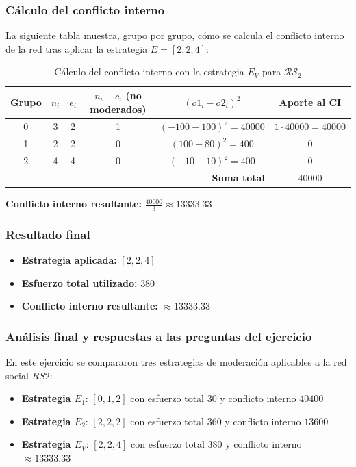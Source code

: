 \documentclass[11pt,letter]{article}
\begin{document}
\subsubsection*{Cálculo del conflicto interno}

La siguiente tabla muestra, grupo por grupo, cómo se calcula el conflicto interno de la red tras aplicar la estrategia $E = [2, 2, 4]$:

\begin{table}[H]
\centering
\begin{tabular}{c|c|c|c|c|c}
\textbf{Grupo} & $n_i$ & $e_i$ & $n_i - c_i$ (no moderados) & $(o1_i - o2_i)^2$ & Aporte al CI \\
\hline
0 & 3 & 2 & 1 & $( -100 - 100 )^2 = 40000$ & $1 \cdot 40000 = 40000$ \\
1 & 2 & 2 & 0 & $(100 - 80)^2 = 400$ & $0$ \\
2 & 4 & 4 & 0 & $(-10 - 10)^2 = 400$ & $0$ \\
\hline
\multicolumn{5}{r|}{\textbf{Suma total}} & 40000 \\
\end{tabular}
\caption{Cálculo del conflicto interno con la estrategia $E_V$ para $\mathcal{RS}_2$}
\end{table}

\textbf{Conflicto interno resultante:} $\frac{40000}{3} \approx 13333.33$

\subsubsection*{Resultado final}

\begin{itemize}
    \item \textbf{Estrategia aplicada:} $[2, 2, 4]$
    \item \textbf{Esfuerzo total utilizado:} $380$
    \item \textbf{Conflicto interno resultante:} $\approx 13333.33$
\end{itemize}

\subsubsection*{Análisis final y respuestas a las preguntas del ejercicio}

En este ejercicio se compararon tres estrategias de moderación aplicables a la red social $RS2$:

\begin{itemize}
    \item \textbf{Estrategia $E_1$}: $[0, 1, 2]$ con esfuerzo total $30$ y conflicto interno $40400$
    \item \textbf{Estrategia $E_2$}: $[2, 2, 2]$ con esfuerzo total $360$ y conflicto interno $13600$
    \item \textbf{Estrategia $E_{V}$}: $[2, 2, 4]$ con esfuerzo total $380$ y conflicto interno $\approx 13333.33$
\end{itemize}
\end{document}
